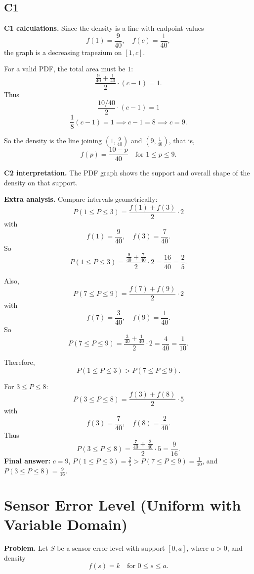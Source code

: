 	\subsection*{C1}
	
	\textbf{C1 calculations.}
	Since the density is a line with endpoint values
	\[
	f(1)=\frac{9}{40},\quad f(c)=\frac{1}{40},
	\]
	the graph is a decreasing trapezium on $[1,c]$.
	
	For a valid PDF, the total area must be $1$:
	\[
	\frac{\frac{9}{40}+\frac{1}{40}}{2}\cdot(c-1)=1.
	\]
	Thus
	\[
	\frac{10/40}{2}\cdot(c-1)=1
	\]
	\[
	\frac18(c-1)=1\implies c-1=8\implies c=9.
	\]
	
	So the density is the line joining $(1,\frac{9}{40})$ and $(9,\frac{1}{40})$, that is,
	\[
	f(p)=\frac{10-p}{40}\quad\text{for }1\le p\le 9.
	\]
	
	\textbf{C2 interpretation.}
	The PDF graph shows the support and overall shape of the density on that support.
	
	\textbf{Extra analysis.}
	Compare intervals geometrically:
	\[
	P(1\le P\le3)=\frac{f(1)+f(3)}{2}\cdot2
	\]
	with
	\[
	f(1)=\frac{9}{40},\quad f(3)=\frac{7}{40}.
	\]
	So
	\[
	P(1\le P\le3)=\frac{\frac{9}{40}+\frac{7}{40}}{2}\cdot2=\frac{16}{40}=\frac25.
	\]
	
	Also,
	\[
	P(7\le P\le9)=\frac{f(7)+f(9)}{2}\cdot2
	\]
	with
	\[
	f(7)=\frac{3}{40},\quad f(9)=\frac{1}{40}.
	\]
	So
	\[
	P(7\le P\le9)=\frac{\frac{3}{40}+\frac{1}{40}}{2}\cdot2=\frac{4}{40}=\frac1{10}.
	\]
	
	Therefore,
	\[
	P(1\le P\le3)>P(7\le P\le9).
	\]
	
	For $3\le P\le8$:
	\[
	P(3\le P\le8)=\frac{f(3)+f(8)}{2}\cdot5
	\]
	with
	\[
	f(3)=\frac{7}{40},\quad f(8)=\frac{2}{40}.
	\]
	Thus
	\[
	P(3\le P\le8)=\frac{\frac{7}{40}+\frac{2}{40}}{2}\cdot5=\frac{9}{16}.
	\]
	\textbf{Final answer:} $c=9$, $P(1\le P\le3)=\frac25>P(7\le P\le9)=\frac1{10}$, and $P(3\le P\le8)=\frac9{16}$.
	
	\section{Sensor Error Level (Uniform with Variable Domain)}
	
	\textbf{Problem.}
	Let $S$ be a sensor error level with support $[0,a]$, where $a>0$, and density
	\[
	f(s)=k\quad\text{for }0\le s\le a.
	\]
	

